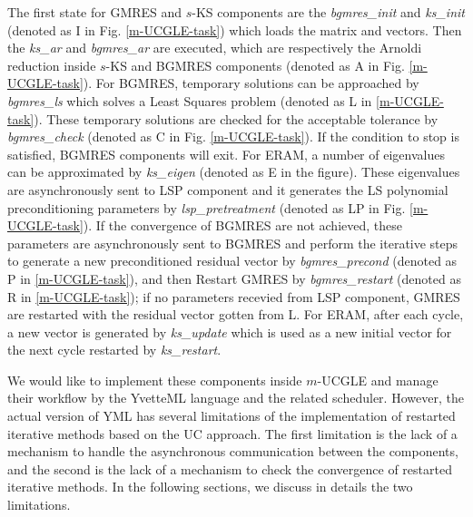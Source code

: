 The first state for GMRES and $s$-KS components are the \textit{bgmres\_init} and \textit{ks\_init} (denoted as I in Fig. \ref{m-UCGLE-task}) which loads the matrix and vectors. Then the \textit{ks\_ar}  and \textit{bgmres\_ar} are executed, which are respectively the Arnoldi reduction inside $s$-KS and BGMRES components (denoted as A in Fig. \ref{m-UCGLE-task}). For BGMRES, temporary solutions can be approached by \textit{bgmres\_ls} which solves a Least Squares problem (denoted as L in \ref{m-UCGLE-task}). These  temporary solutions are checked for the acceptable tolerance by \textit{bgmres\_check} (denoted as C in Fig. \ref{m-UCGLE-task}). If the condition to stop is satisfied, BGMRES components will exit. For ERAM, a number of eigenvalues can be approximated by \textit{ks\_eigen} (denoted as E in the figure). These eigenvalues are asynchronously sent to LSP component and it generates the LS polynomial preconditioning parameters by \textit{lsp\_pretreatment} (denoted as LP in Fig. \ref{m-UCGLE-task}). If the convergence of BGMRES are not achieved, these parameters are asynchronously sent to BGMRES and perform the iterative steps to generate a new preconditioned residual vector by \textit{bgmres\_precond} (denoted as P in \ref{m-UCGLE-task}), and then Restart GMRES by \textit{bgmres\_restart} (denoted as R in \ref{m-UCGLE-task}); if no parameters recevied from LSP component, GMRES are restarted with the residual vector gotten from L. For ERAM, after each cycle, a new vector is generated by \textit{ks\_update} which is used as a new initial vector for the next cycle restarted by \textit{ks\_restart}. 

We would like to implement these components inside $m$-UCGLE and manage their workflow by the YvetteML language and the related scheduler. However, the actual version of YML has several limitations of the implementation of restarted iterative methods based on the UC approach. The first limitation is the lack of a mechanism to handle the asynchronous communication between the components, and the second is the lack of a mechanism to check the convergence of restarted iterative methods. In the following sections, we discuss in details the two limitations.

